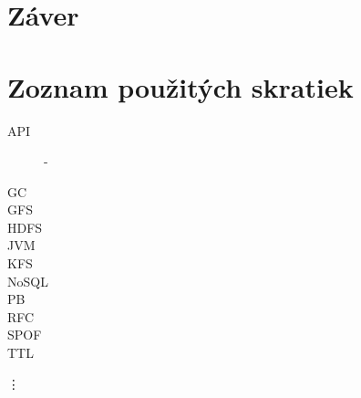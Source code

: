 \documentclass[11pt,twoside,a4paper]{book}
\begin{document}
\chapter{Záver}

% 







%
{
\def\CS{$\cal C\kern-0.1667em\lower.5ex\hbox{$\cal S$}\kern-0.075em $}

}

%

\appendix



\chapter{Zoznam použitých skratiek}
\begin{description}
\item[]

\item[API] - 
\item[GC]
\item[GFS]
\item[HDFS]
\item[JVM]
\item[KFS]
\item[NoSQL]
\item[PB]
\item[]
\item[RFC]
\item[SPOF]
\item[TTL]
\end{description}
\vdots
\end{document}
